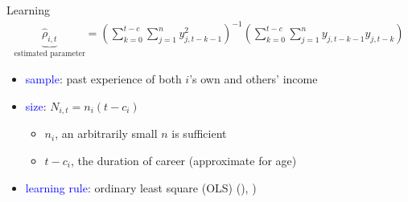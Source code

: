 \documentclass{beamer}
\begin{document}
\begin{frame}{Learning}
	\begin{eqnarray}
		\underbrace{\hat \rho_{i,t}}_{\text{estimated parameter}}= (\sum^{t-c}_{k=0}\sum^{n}_{j=1}y^2_{j,t-k-1})^{-1}(\sum^{t-c}_{k=0}\sum^{n}_{j=1}y_{j,t-k-1}y_{j,t-k})
	\end{eqnarray}
	
	\begin{itemize}
		\item \textcolor{blue}{sample}: past experience of both $i$'s own and others' income
		\item \textcolor{blue}{size}:   $N_{i,t} = n_i (t-c_i )$
		\begin{itemize}
			\item $n_i$, an arbitrarily small $n$ is sufficient
			\item $t-c_i$, the duration of career (approximate for age)   
		\end{itemize}
		\item \textcolor{blue}{learning rule}: ordinary least square (OLS) (\cite{evans2012learning}), \cite{malmendier2015learning})
	\end{itemize} 
\end{frame}
\end{document}
